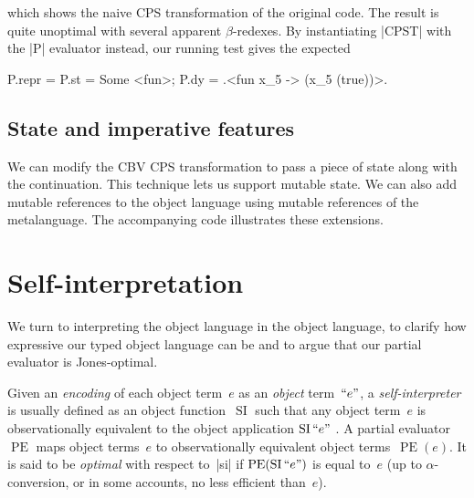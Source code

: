 \documentclass[preprint]{sigplanconf}
\newcommand{\Encode}[1]{\mathinner{\mathopen{\text{``}}#1\mathclose{\text{''}}}}
\DeclareMathOperator{\pe}{PE}
\DeclareMathOperator{\si}{SI}
\begin{document}
which shows the naive CPS transformation of the original code. The result is
quite unoptimal with several apparent $\beta$-redexes. 
By instantiating |CPST| with the |P| evaluator instead, our
running test gives the expected
\begin{code}
  P.repr = {P.st = Some <fun>;
            P.dy = .<fun x_5 -> (x_5 (true))>.}
\end{code}

\subsection{State and imperative features}
\label{state}

We can modify the CBV CPS transformation to pass a piece of state along
with the continuation. This technique lets us support mutable state. We
can also add mutable references to the object language using mutable
references of the metalanguage.  The accompanying code illustrates these
extensions.

\section{Self-interpretation}\label{selfinterp}

We turn to interpreting the object language in the object language, to
clarify how expressive our typed object language can be and to argue that our
partial evaluator is Jones\hyp optimal.

Given an \emph{encoding} of each object term~$e$ as an \emph{object} term~$\Encode{e}$,
a \emph{self\hyp interpreter} is usually defined as an object
function~$\si$ such that any object term~$e$ is observationally
equivalent to the object application $\si\Encode{e}$
\citep{jones-partial,taha-tag,Danvy-tagging-encoding}.
A partial evaluator~$\pe$ maps object terms~$e$ to observationally
equivalent object terms~$\pe(e)$.  It is said to be
\emph{optimal} with respect to~|si| if $\pe(\si\Encode{e})$
is equal to~$e$ (up to $\alpha$\hyp conversion, or in some accounts, no
less efficient than~$e$).
\end{document}
